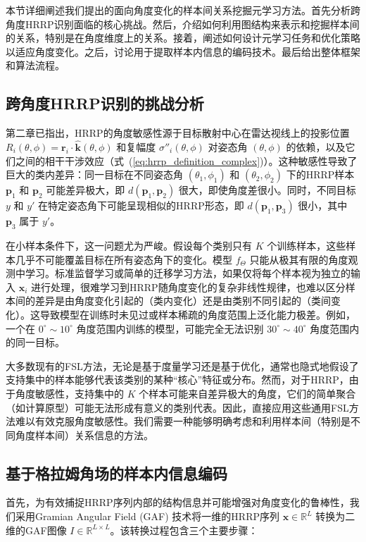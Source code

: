 本节详细阐述我们提出的面向角度变化的样本间关系挖掘元学习方法。首先分析跨角度HRRP识别面临的核心挑战。然后，介绍如何利用图结构来表示和挖掘样本间的关系，特别是在角度维度上的关系。接着，阐述如何设计元学习任务和优化策略以适应角度变化。之后，讨论用于提取样本内信息的编码技术。最后给出整体框架和算法流程。

\subsection{跨角度HRRP识别的挑战分析}
\label{subsec:angle_challenge_analysis}

第二章已指出，HRRP的角度敏感性源于目标散射中心在雷达视线上的投影位置 $R_i(\theta, \phi) = \mathbf{r}_i \cdot \hat{\mathbf{k}}(\theta, \phi)$ 和复幅度 $\sigma''_i(\theta, \phi)$ 对姿态角 $(\theta, \phi)$ 的依赖，以及它们之间的相干干涉效应（式~(\ref{eq:hrrp_definition_complex})）。这种敏感性导致了巨大的类内差异：同一目标在不同姿态角 $(\theta_1, \phi_1)$ 和 $(\theta_2, \phi_2)$ 下的HRRP样本 $\mathbf{p}_1$ 和 $\mathbf{p}_2$ 可能差异极大，即 $d(\mathbf{p}_1, \mathbf{p}_2)$ 很大，即使角度差很小。同时，不同目标 $y$ 和 $y'$ 在特定姿态角下可能呈现相似的HRRP形态，即 $d(\mathbf{p}_1, \mathbf{p}_3)$ 很小，其中 $\mathbf{p}_3$ 属于 $y'$。

在小样本条件下，这一问题尤为严峻。假设每个类别只有 $K$ 个训练样本，这些样本几乎不可能覆盖目标在所有姿态角下的变化。模型 $f_\Theta$ 只能从极其有限的角度观测中学习。标准监督学习或简单的迁移学习方法，如果仅将每个样本视为独立的输入 $\mathbf{x}_i$ 进行处理，很难学习到HRRP随角度变化的复杂非线性规律，也难以区分样本间的差异是由角度变化引起的（类内变化）还是由类别不同引起的（类间变化）。这导致模型在训练时未见过或样本稀疏的角度范围上泛化能力极差。例如，一个在 $0^\circ \sim 10^\circ$ 角度范围内训练的模型，可能完全无法识别 $30^\circ \sim 40^\circ$ 角度范围内的同一目标。

大多数现有的FSL方法，无论是基于度量学习还是基于优化，通常也隐式地假设了支持集中的样本能够代表该类别的某种“核心”特征或分布。然而，对于HRRP，由于角度敏感性，支持集中的 $K$ 个样本可能来自差异极大的角度，它们的简单聚合（如计算原型）可能无法形成有意义的类别代表。因此，直接应用这些通用FSL方法难以有效克服角度敏感性。我们需要一种能够明确考虑和利用样本间（特别是不同角度样本间）关系信息的方法。

\subsection{基于格拉姆角场的样本内信息编码}
\label{subsec:gaf}

首先，为有效捕捉HRRP序列内部的结构信息并可能增强对角度变化的鲁棒性，我们采用Gramian Angular Field (GAF) 技术将一维的HRRP序列 $\mathbf{x} \in \mathbb{R}^L$ 转换为二维的GAF图像 $I \in \mathbb{R}^{L \times L}$。该转换过程包含三个主要步骤：

